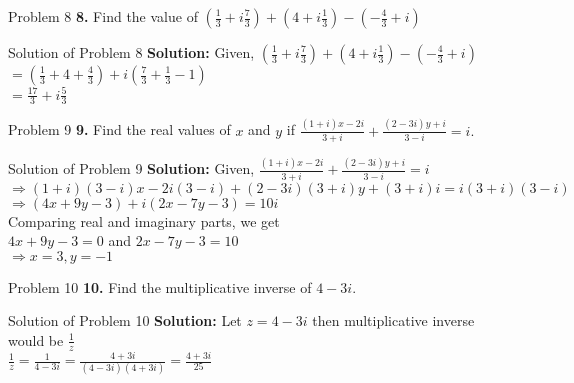 \documentclass[aspectratio=169,8pt]{beamer}
\begin{document}
\begin{frame}{Problem 8}
  \textbf{8.} Find the value of $\left(\frac{1}{3} + i\frac{7}{3}\right) + \left(4 + i\frac{1}{3}\right) - \left(-\frac{4}{3} + i\right)$
\end{frame}
\begin{frame}{Solution of Problem 8}
  \textbf{Solution:} Given, $\left(\frac{1}{3} + i\frac{7}{3}\right) + \left(4 + i\frac{1}{3}\right) - \left(-\frac{4}{3} + i\right)$\\
  \vspace*{0.2cm}
  $= \left(\frac{1}{3} + 4 + \frac{4}{3}\right) + i\left(\frac{7}{3} + \frac{1}{3} - 1\right)$\\
  \vspace*{0.2cm}
  $= \frac{17}{3} +i\frac{5}{3}$
\end{frame}
\begin{frame}{Problem 9}
  \textbf{9.} Find the real values of $x$ and $y$ if $\frac{(1 + i)x - 2i}{3 + i} + \frac{(2 - 3i)y + i}{3 - i} = i.$
\end{frame}
\begin{frame}{Solution of Problem 9}
  \textbf{Solution:} Given, $\frac{(1 + i)x - 2i}{3 + i} + \frac{(2 - 3i)y + i}{3 - i} = i$\\
  \vspace*{0.2cm}
  $\Rightarrow (1 + i)(3 - i)x - 2i(3 - i) + (2 - 3i)(3 + i)y + (3 + i)i = i(3 + i)(3 - i)$\\
  \vspace*{0.2cm}
  $\Rightarrow (4x + 9y - 3) + i(2x - 7y - 3) = 10i$\\
  \vspace*{0.2cm}
  Comparing real and imaginary parts, we get\\
  \vspace*{0.2cm}
  $4x + 9y - 3 = 0$ and $2x - 7y - 3 = 10$\\
  \vspace*{0.2cm}
  $\Rightarrow x = 3, y = -1$
\end{frame}
\begin{frame}{Problem 10}
  \textbf{10.} Find the multiplicative inverse of $4 - 3i.$
\end{frame}
\begin{frame}{Solution of Problem 10}
  \textbf{Solution:} Let $z = 4 - 3i$ then multiplicative inverse would be $\frac{1}{z}$\\
  \vspace*{0.2cm}
  $\frac{1}{z} = \frac{1}{4 - 3i} = \frac{4 + 3i}{(4 -3i)(4 + 3i)} = \frac{4 + 3i}{25}$
\end{frame}
\end{document}
